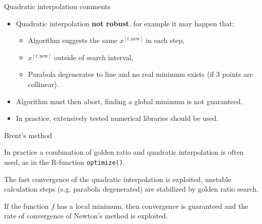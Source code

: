\documentclass[11pt,compress,t,notes=noshow, xcolor=table]{beamer}
\begin{document}
\begin{vbframe}{Quadratic interpolation comments}
\begin{itemize}
\item Quadratic interpolation \textbf{not robust}, for example it may happen that:
\begin{itemize}
\item Algorithm suggests the same $x^{[t, \text{new}]}$ in each step,
\item $x^{[t, \text{new}]}$ outside of search interval,
\item Parabola degenerates to line and no real minimum exists (if 3 points are collinear).
\end{itemize}
\item Algorithm must then abort, finding a global minimum is not guaranteed.
\item In practice, extensively tested numerical libraries should be used.
\end{itemize}
\end{vbframe}

\begin{vbframe}{Brent's method}

In practice a combination of golden ratio and quadratic interpolation is often used, as in the R-function \texttt{optimize()}.

\lz

The fast convergence of the quadratic interpolation is exploited, unstable calculation steps (e.g. parabola degenerated) are stabilized by golden ratio search.

\lz

If the function $f$ has a local minimum, then convergence is guaranteed and the rate of convergence of Newton's method is exploited.

\end{vbframe}
\end{document}
